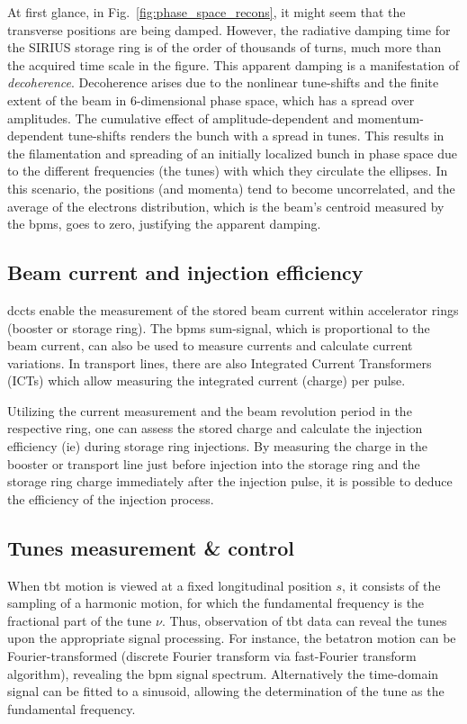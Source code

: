At first glance, in Fig.~\ref{fig:phase_space_recons}, it might seem that the transverse positions are being damped. However, the radiative damping time for the SIRIUS storage ring is of the order of thousands of turns, much more than the acquired time scale in the figure. This apparent damping is a manifestation of \textit{decoherence}. Decoherence arises due to the nonlinear tune-shifts and the finite extent of the beam in 6-dimensional phase space, which has a spread over amplitudes. The cumulative effect of amplitude-dependent and momentum-dependent tune-shifts renders the bunch with a spread in tunes. This results in the filamentation and spreading of an initially localized bunch in phase space due to the different frequencies (the tunes) with which they circulate the ellipses. In this scenario, the positions (and momenta) tend to become uncorrelated, and the average of the electrons distribution, which is the beam's centroid measured by the \glspl*{bpm}, goes to zero, justifying the apparent damping.
\subsection{Beam current and injection efficiency}
\glspl*{dcct} enable the measurement of the stored beam current within accelerator rings (booster or storage ring). The \glspl*{bpm} sum-signal, which is proportional to the beam current, can also be used to measure currents and calculate current variations. In transport lines, there are also Integrated Current Transformers (ICTs) which allow measuring the integrated current (charge) per pulse.

Utilizing the current measurement and the beam revolution period in the respective ring, one can assess the stored charge and calculate the injection efficiency (\gls*{ie}) during storage ring injections. By measuring the charge in the booster or transport line just before injection into the storage ring and the storage ring charge immediately after the injection pulse, it is possible to deduce the efficiency of the injection process.
\subsection{Tunes measurement \& control}
When \gls*{tbt} motion is viewed at a fixed longitudinal position $s$, it consists of the sampling of a harmonic motion, for which the fundamental frequency is the fractional part of the tune $\nu$. Thus, observation of \gls*{tbt} data can reveal the tunes upon the appropriate signal processing. For instance, the betatron motion can be Fourier-transformed (discrete Fourier transform via fast-Fourier transform algorithm), revealing the \gls*{bpm} signal spectrum. Alternatively the time-domain signal can be fitted to a sinusoid, allowing the determination of the tune as the fundamental frequency.

